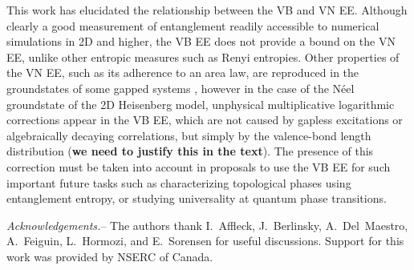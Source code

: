 \documentclass[prl,aps,twocolumn,floatfix,amsmath,amssymb,superscriptaddress,tightenlines]{revtex4}
\begin{document}
This work has elucidated the relationship between the VB and VN EE.
Although clearly a good measurement of entanglement readily accessible to
numerical simulations in 2D and higher, the VB EE does not provide a bound
on the VN EE, unlike other entropic measures such as Renyi entropies.
Other properties of the VN EE, such as its adherence to an area law, are
reproduced in the groundstates of some gapped systems \cite{Alet,Chh},
however in the case of the N\'eel groundstate of the 2D Heisenberg model,
unphysical multiplicative logarithmic corrections appear in the VB EE,
which are not caused by gapless excitations or algebraically decaying
correlations, but simply by the valence-bond length distribution ({\bf we
need to justify this in the text}).  The presence of this correction must
be taken into account in proposals to use the VB EE for such important
future tasks such as characterizing topological phases using entanglement
entropy, or studying universality at quantum phase transitions.

{\it Acknowledgements.}-- The authors thank I.~Affleck, J.~Berlinsky,
A.~Del~Maestro, A.~Feiguin, L.~Hormozi, and E.~Sorensen for useful
discussions. Support for this work was provided by NSERC of Canada.



\end{document}
